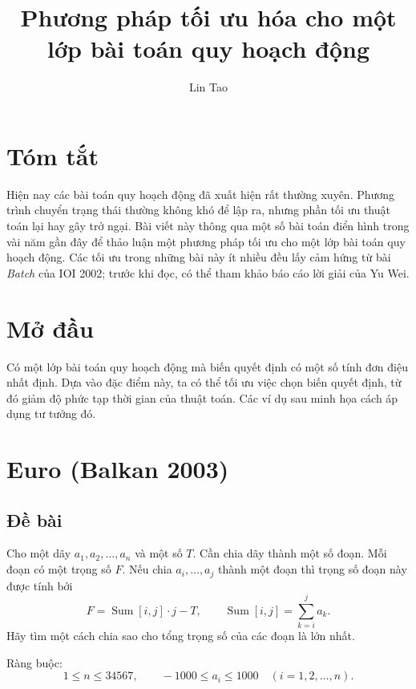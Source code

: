 \documentclass[11pt]{article}
\title{Phương pháp tối ưu hóa cho một lớp bài toán quy hoạch động}
\author{Lin Tao}
\date{}
\begin{document}
\maketitle


\section*{Tóm tắt}

Hiện nay các bài toán quy hoạch động đã xuất hiện rất thường xuyên. Phương
trình chuyển trạng thái thường không khó để lập ra, nhưng phần tối ưu thuật
toán lại hay gây trở ngại. Bài viết này thông qua một số bài toán điển hình
trong vài năm gần đây để thảo luận một phương pháp tối ưu cho một lớp bài
toán quy hoạch động. Các tối ưu trong những bài này ít nhiều đều lấy cảm hứng
từ bài \emph{Batch} của IOI 2002; trước khi đọc, có thể tham khảo báo cáo lời
giải của Yu Wei.

\section{Mở đầu}

Có một lớp bài toán quy hoạch động mà biến quyết định có một số tính đơn điệu
nhất định. Dựa vào đặc điểm này, ta có thể tối ưu việc chọn biến quyết định,
từ đó giảm độ phức tạp thời gian của thuật toán. Các ví dụ sau minh họa cách
áp dụng tư tưởng đó.

\section{Euro (Balkan 2003)}

\subsection*{Đề bài}

Cho một dãy $a_1,a_2,\ldots,a_n$ và một số $T$. Cần chia dãy thành một số đoạn.
Mỗi đoạn có một trọng số $F$. Nếu chia $a_i,\ldots,a_j$ thành một đoạn thì
trọng số đoạn này được tính bởi
\[
  F=\operatorname{Sum}[i,j]\cdot j-T,
  \qquad
  \operatorname{Sum}[i,j]=\sum_{k=i}^{j} a_k.
\]
Hãy tìm một cách chia sao cho tổng trọng số của các đoạn là lớn nhất.

Ràng buộc:
\[
  1\le n\le 34567,\qquad
  -1000\le a_i\le 1000\quad (i=1,2,\ldots,n).
\]
\end{document}
